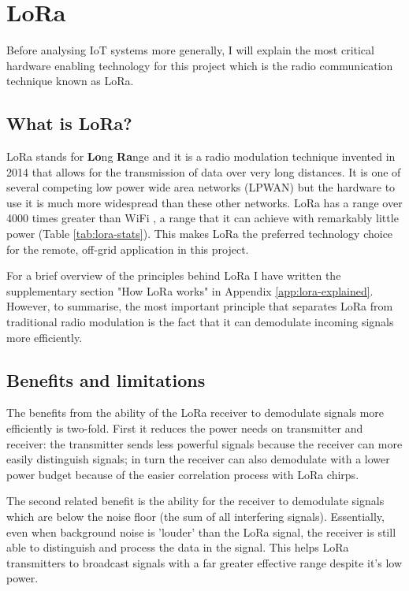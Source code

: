\section{LoRa}\label{sec:lora}

Before analysing IoT systems more generally, I will explain the most critical
hardware enabling technology for this project which is the radio communication
technique known as LoRa.

\subsection{What is LoRa?}

LoRa stands for \textbf{Lo}ng \textbf{Ra}nge and it is a radio modulation
technique invented in 2014 that allows for the transmission of data over very
long distances. It is one of several competing low power wide area networks
(LPWAN) but the hardware to use it is much more widespread than these other
networks. LoRa has a range over 4000 times greater than WiFi \cite{spiess2019},
a range that it can achieve with remarkably little power (Table
\ref{tab:lora-stats}). This makes LoRa the preferred technology choice for
the remote, off-grid application in this project.
 
For a brief overview of the principles behind LoRa I have written the
supplementary section "How LoRa works" in Appendix \ref{app:lora-explained}.
However, to summarise, the most important principle that separates LoRa from
traditional radio modulation is the fact that it can demodulate incoming signals
more efficiently.

\subsection{Benefits and limitations}\label{sec:lora-benefits}

The benefits from the ability of the LoRa receiver to demodulate signals more
efficiently is two-fold. First it reduces the power needs on transmitter and
receiver: the transmitter sends less powerful signals because the receiver can
more easily distinguish signals; in turn the receiver can also demodulate with a
lower power budget because of the easier correlation process with LoRa chirps.

The second related benefit is the ability for the receiver to demodulate signals
which are below the noise floor (the sum of all interfering signals).
Essentially, even when background noise is 'louder' than the LoRa signal, the
receiver is still able to distinguish and process the data in the signal. This
helps LoRa transmitters to broadcast signals with a far greater effective range
despite it's low power. 


